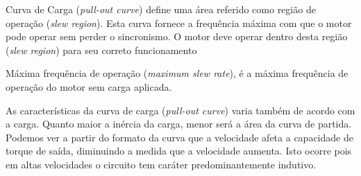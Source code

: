Curva de Carga (\textit{pull-out curve}) define uma área referido como região de operação (\textit{slew region}). Esta curva fornece a frequência máxima com que o motor pode operar sem perder o sincronismo. O motor deve operar dentro desta região (\textit{slew region}) para seu correto funcionamento 

Máxima frequência de operação (\textit{maximum slew rate}), é a máxima frequência de operação do motor sem carga aplicada.

As características da curva de carga (\textit{pull-out curve}) varia também de acordo com a carga. Quanto maior a inércia da carga, menor será a área da curva de partida. Podemos ver a partir do formato da curva que a velocidade afeta a capacidade de torque de saída, diminuindo a medida que a velocidade aumenta. Isto ocorre pois em altas velocidades o circuito tem caráter predominantemente indutivo.



